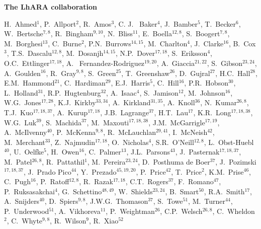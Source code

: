 \vspace{0.75cm}
\begin{center}
  {\bf \color{BlueViolet} The LhARA collaboration} \\
  \vspace{0.25cm}
\end{center}
\begin{center}
  H.~Ahmed$^{1}$,
  P.~Allport$^{2}$,
  R.~Amos$^{3}$,
  C. J. ~Baker$^{4}$,
  J.~Bamber$^{5}$,
  T.~Becker$^{6}$,
  W.~Bertsche$^{7,8}$,
  R.~Bingham$^{9,10}$,
  N.~Bliss$^{11}$,
  E.~Boella$^{12,8}$,
  S.~Boogert$^{7,8}$,
  M.~Borghesi$^{13}$,
  C.~Burne$^{2}$,
  P.N.~Burrows$^{14,15}$,
  M.~Charlton$^{4}$,
  J.~Clarke$^{16}$,
  B.~Cox$^{3}$,
  T.S.~Dascalu$^{12,8}$,
  M.~Dosanjh$^{14,15}$,
  N.P.~Dover$^{17,18}$,
  S.~Eriksson$^{4}$,
  O.C.~Ettlinger$^{17,18}$,
  A. ~Fernandez-Rodriguez$^{19,20}$,
  A.~Giaccia$^{21,22}$,
  S.~Gibson$^{23,24}$,
  A.~Goulden$^{16}$,
  R.~Gray$^{9,8}$,
  S.~Green$^{25}$,
  T.~Greenshaw$^{26}$,
  D.~Gujral$^{27}$,
  H.C.~Hall$^{28}$,
  E.M.~Hammond$^{21}$,
  C.~Hardiman$^{29}$,
  E.J.~Harris$^{5}$,
  C.~Hill$^{16}$,
  P.R.~Hobson$^{30}$,
  L.~Holland$^{31}$,
  R.P.~Hugtenburg$^{32}$,
  A.~Isaac$^{4}$,
  S.~Jamison$^{12}$,
  M.~Johnson$^{16}$,
  W.G.~Jones$^{17,28}$,
  K.J.~Kirkby$^{33,34}$,
  A.~Kirkland$^{31,35}$,
  A.~Knoll$^{36}$,
  N.~Kumar$^{26,8}$,
  T.J.~Kuo$^{17,18,37}$,
  A.~Kurup$^{17,18}$,
  J.B.~Lagrange$^{37}$,
  H.T.~Lau$^{17}$,
  K.R.~Long$^{17,18,38}$,
  W.G.~Luk$^{39}$,
  S.~Machida$^{37}$,
  M.~Maxouti$^{17,18,38}$,
  J.M.~McGarrigle$^{17,19}$,
  A.~McIlvenny$^{40}$,
  P.~McKenna$^{9,8}$,
  R.~McLauchlan$^{29,41}$,
  I.~McNeish$^{42}$,
  M.~Merchant$^{33}$,
  Z.~Najmudin$^{17,18}$,
  O.~Nicholas$^{4}$,
  S.R.~O'Neill$^{12,8}$,
  L.~Obst-Huebl$^{40}$,
  U.~Oelfke$^{5}$,
  H.~Owen$^{16}$,
  C.~Palmer$^{13}$,
  J.L.~Parsons$^{43}$,
  J.~Pasternak$^{17,18,37}$,
  M.~Patel$^{26,8}$,
  R.~Pattathil$^{1}$,
  M.~Pereira$^{23,24}$,
  D.~Posthuma de Boer$^{37}$,
  J.~Pozimski$^{17,18,37}$,
  J.~Prado Pico$^{44}$,
  Y.~Prezado$^{45,19,20}$,
  P.~Price$^{42}$,
  T.~Price$^{2}$,
  K.M.~Prise$^{46}$,
  C.~Pugh$^{16}$,
  P.~Ratoff$^{12,8}$,
  R.~Razak$^{17,18}$,
  C.T.~Rogers$^{37}$,
  F.~Romano$^{47}$,
  P.~Ruksasakchai$^{4}$,
  G.~Schettino$^{48,49}$,
  W.~Shields$^{23,24}$,
  B.~Smart$^{50}$,
  R.A.~Smith$^{17}$,
  A.~Snijders$^{40}$,
  D.~Spiers$^{9,8}$,
  J.W.G.~Thomason$^{37}$,
  S.~Towe$^{51}$,
  M.~Turner$^{44}$,
  P.~Underwood$^{51}$,
  A.~Vikhoreva$^{11}$,
  P.~Weightman$^{26}$,
  C.P.~Welsch$^{26,8}$,
  C.~Wheldon$^{2}$,
  C.~Whyte$^{9,8}$,
  R.~Wilson$^{9}$,
  R.~Xiao$^{52}$
\end{center}
